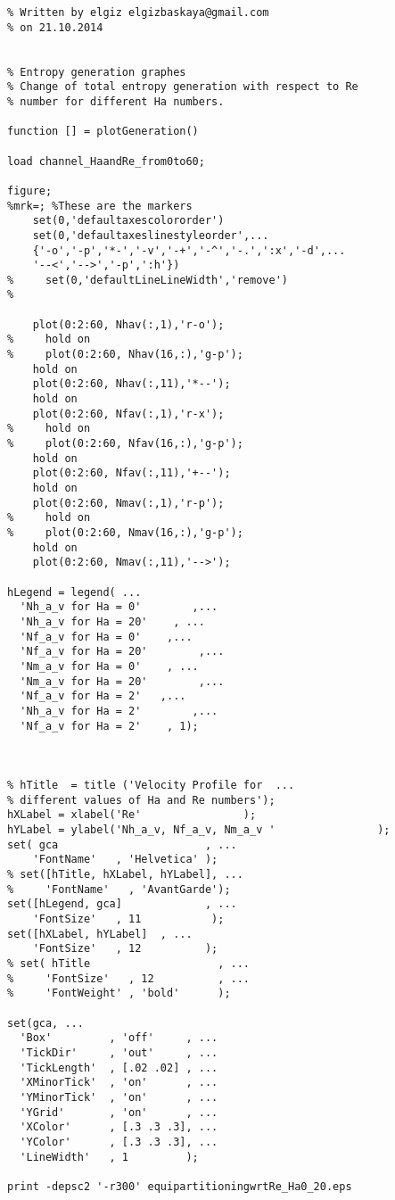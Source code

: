 \begin{lstlisting}
% Written by elgiz elgizbaskaya@gmail.com
% on 21.10.2014


% Entropy generation graphes
% Change of total entropy generation with respect to Re 
% number for different Ha numbers.

function [] = plotGeneration()

load channel_HaandRe_from0to60;

figure;
%mrk=; %These are the markers
    set(0,'defaultaxescolororder')
    set(0,'defaultaxeslinestyleorder',...
    {'-o','-p','*-','-v','-+','-^','-.',':x','-d',...
    '--<','-->','-p',':h'})
%     set(0,'defaultLineLineWidth','remove')
% 

    plot(0:2:60, Nhav(:,1),'r-o');
%     hold on
%     plot(0:2:60, Nhav(16,:),'g-p');
    hold on
    plot(0:2:60, Nhav(:,11),'*--');
    hold on
    plot(0:2:60, Nfav(:,1),'r-x');
%     hold on
%     plot(0:2:60, Nfav(16,:),'g-p');
    hold on
    plot(0:2:60, Nfav(:,11),'+--');
    hold on
    plot(0:2:60, Nmav(:,1),'r-p');
%     hold on
%     plot(0:2:60, Nmav(16,:),'g-p');
    hold on
    plot(0:2:60, Nmav(:,11),'-->');
 
hLegend = legend( ...
  'Nh_a_v for Ha = 0'        ,...
  'Nh_a_v for Ha = 20'    , ...
  'Nf_a_v for Ha = 0'    ,...
  'Nf_a_v for Ha = 20'        ,...
  'Nm_a_v for Ha = 0'    , ...
  'Nm_a_v for Ha = 20'        ,...
  'Nf_a_v for Ha = 2'   ,...
  'Nh_a_v for Ha = 2'        ,...
  'Nf_a_v for Ha = 2'    , 1);



% hTitle  = title ('Velocity Profile for  ...
% different values of Ha and Re numbers');
hXLabel = xlabel('Re'                );
hYLabel = ylabel('Nh_a_v, Nf_a_v, Nm_a_v '                );
set( gca                       , ...
    'FontName'   , 'Helvetica' );
% set([hTitle, hXLabel, hYLabel], ...
%     'FontName'   , 'AvantGarde');
set([hLegend, gca]             , ...
    'FontSize'   , 11           );
set([hXLabel, hYLabel]  , ...
    'FontSize'   , 12          );
% set( hTitle                    , ...
%     'FontSize'   , 12          , ...
%     'FontWeight' , 'bold'      );

set(gca, ...
  'Box'         , 'off'     , ...
  'TickDir'     , 'out'     , ...
  'TickLength'  , [.02 .02] , ...
  'XMinorTick'  , 'on'      , ...
  'YMinorTick'  , 'on'      , ...
  'YGrid'       , 'on'      , ...
  'XColor'      , [.3 .3 .3], ...
  'YColor'      , [.3 .3 .3], ...
  'LineWidth'   , 1         );

print -depsc2 '-r300' equipartitioningwrtRe_Ha0_20.eps

\end{lstlisting}

